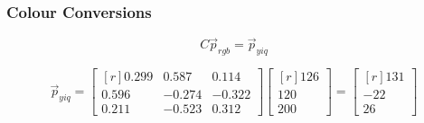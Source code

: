     \begin{frame}\frametitle{Colour Conversions}
$$ C\vec{p}_{rgb}=\vec{p}_{yiq}$$
       
    $$\vec{p}_{yiq} = \begin{bmatrix*}[r]
                0.299       & 0.587  & 0.114 \\
                0.596       & -0.274  & -0.322  \\
                0.211        & -0.523   & 0.312  
            \end{bmatrix*}
            \begin{bmatrix*}[r]
            126       \\
            120        \\
            200         
            \end{bmatrix*} = 
            \begin{bmatrix*}[r]
            131       \\
            -22        \\
            26         
            \end{bmatrix*} $$

\end{frame}


